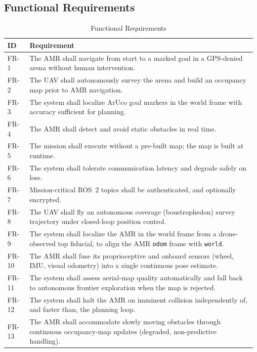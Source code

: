 \documentclass[conference]{IEEEtran}
\begin{document}
\subsection{Functional Requirements}
\begin{table}[t]
\caption{Functional Requirements}
\label{tab:fr}
\centering
\begin{tabular}{@{}p{}p{}@{}}
\toprule
\textbf{ID} & \textbf{Requirement} \\
\midrule
FR-1 & The AMR shall navigate from start to a marked goal in a GPS-denied arena without human intervention. \\
FR-2 & The UAV shall autonomously survey the arena and build an occupancy map prior to AMR navigation. \\
FR-3 & The system shall localize ArUco goal markers in the world frame with accuracy sufficient for planning. \\
FR-4 & The AMR shall detect and avoid static obstacles in real time. \\
FR-5 & The mission shall execute without a pre-built map; the map is built at runtime. \\
FR-6 & The system shall tolerate communication latency and degrade safely on loss. \\
FR-7 & Mission-critical ROS~2 topics shall be authenticated, and optionally encrypted. \\
FR-8 & The UAV shall fly an autonomous coverage (boustrophedon) survey trajectory under closed-loop position control. \\
FR-9 & The system shall localize the AMR in the world frame from a drone-observed top fiducial, to align the AMR \texttt{odom} frame with \texttt{world}. \\
FR-10 & The AMR shall fuse its proprioceptive and onboard sensors (wheel, IMU, visual odometry) into a single continuous pose estimate. \\
FR-11 & The system shall assess aerial-map quality automatically and fall back to autonomous frontier exploration when the map is rejected. \\
FR-12 & The system shall halt the AMR on imminent collision independently of, and faster than, the planning loop. \\
FR-13 & The AMR shall accommodate slowly moving obstacles through continuous occupancy-map updates (degraded, non-predictive handling). \\
\bottomrule
\end{tabular}
\end{table}
\end{document}
